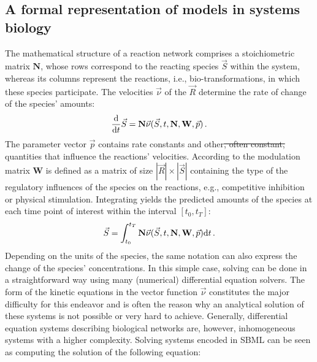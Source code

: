 \documentclass[10pt]{bmc_article}
\newenvironment{bmcformat}{\fussy\setboolean{publ}{true}}{\fussy}
\begin{document}
\begin{bmcformat}
\subsection*{A formal representation of models in systems biology}

The mathematical structure of a reaction network comprises a stoichiometric
matrix $\mathbf{N}$, whose rows correspond to the reacting species $\vec{S}$
within the system, whereas its columns represent the reactions, i.e., bio-transformations,
in which these species participate.
The velocities $\vec{\nu}$ of the  $\vec{R}$ determine the rate of
change of the species' amounts:
\begin{equation}
\frac{\mathrm{d}}{\mathrm{d} t}\vec{S} = \mathbf{N}\vec{\nu}(\vec{S}, t, \mathbf{N}, \mathbf{W}, \vec{p})\,.
\label{eq:SpeciesChange}
\end{equation}
The parameter vector $\vec{p}$ contains rate constants
and other\sout{, often constant,} quantities that influence the reactions' velocities.
According to  \cite{Liebermeister2006, Liebermeister2010} the modulation matrix
$\mathbf{W}$ is defined as a matrix of size $|\vec{R}|\times|\vec{S}|$
containing the type of the regulatory influences of the species on
the reactions, e.g., competitive inhibition or physical stimulation.
Integrating  yields the predicted amounts of the
species at each time point of interest within the interval $[t_0, t_T]$:
\begin{equation}
\vec{S} = \int_{t_0}^{t_T} \mathbf{N}\vec{\nu}(\vec{S}, t, \mathbf{N}, \mathbf{W}, \vec{p})
\mathrm{d} t\,.
\label{eq:SpeciesChangeIntegral}
\end{equation}
Depending on the units of the species, the same notation can also express the
change of the species' concentrations.
In this simple case, solving  can be done in a
straightforward way using many (numerical) differential equation solvers.
The  form of the kinetic equations in the vector function $\vec{\nu}$
constitutes the major difficulty for this endeavor and is often the reason why
an analytical solution of these systems is not possible or very hard to achieve.
Generally, differential equation systems describing biological networks are,
however, inhomogeneous systems with a higher complexity.
Solving systems encoded in \acs{SBML} can be seen as computing the solution of the following
equation:
\end{bmcformat}
\end{document}
